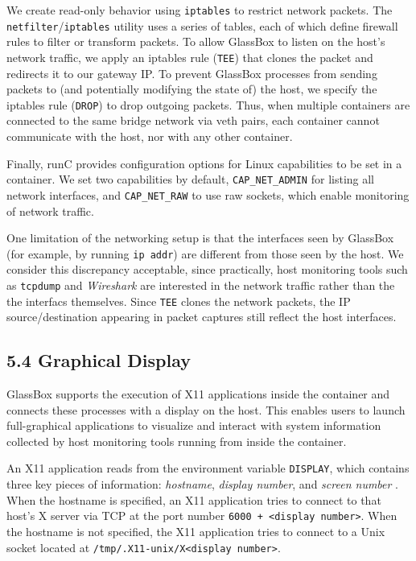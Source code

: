 \documentclass{proc}
\begin{document}
We create read-only behavior using \texttt{iptables} to restrict network packets. The \texttt{netfilter}/\texttt{iptables} utility uses a series of tables, each of which define firewall rules to filter or transform packets. To allow GlassBox to listen on the host's network traffic, we apply an iptables rule (\texttt{TEE}) that clones the packet and redirects it to our gateway IP. To prevent GlassBox processes from sending packets to (and potentially modifying the state of) the host, we specify the iptables rule (\texttt{DROP}) to drop outgoing packets. Thus, when multiple containers are connected to the same bridge network via veth pairs, each container cannot communicate with the host, nor with any other container.

Finally, runC provides configuration options for Linux capabilities to be set in a container. We set two capabilities by default, \texttt{CAP\_NET\_ADMIN} for listing all network interfaces, and \texttt{CAP\_NET\_RAW} to use raw sockets, which enable monitoring of network traffic.

One limitation of the networking setup is that the interfaces seen by GlassBox (for example, by running \texttt{ip addr}) are different from those seen by the host. We consider this discrepancy acceptable, since practically, host monitoring tools such as \texttt{tcpdump} and \textit{Wireshark} are interested in the network traffic rather than the the interfacs themselves. Since \texttt{TEE} clones the network packets, the IP source/destination appearing in packet captures still reflect the host interfaces.

\subsection*{5.4 Graphical Display}

GlassBox supports the execution of X11 applications inside the container and connects these processes with a display on the host. This enables users to launch full-graphical applications to visualize and interact with system information collected by host monitoring tools running from inside the container.

An X11 application reads from the environment variable \texttt{DISPLAY}, which contains three key pieces of information: \textit{hostname}, \textit{display number}, and \textit{screen number} \cite{xman}. When the hostname is specified, an X11 application tries to connect to that host's X server via TCP at the port number \texttt{6000 + <display number>}. When the hostname is not specified, the X11 application tries to connect to a Unix socket located at \texttt{/tmp/.X11-unix/X<display number>}.
\end{document}
